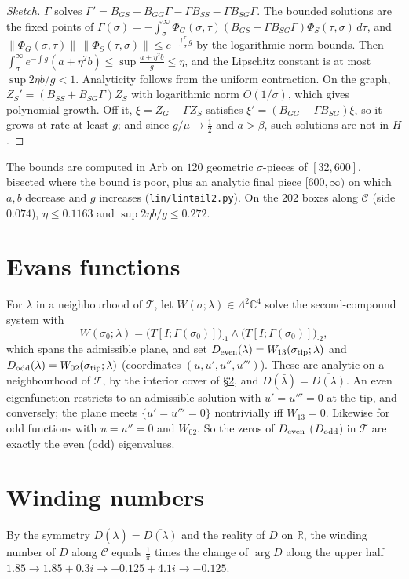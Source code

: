 \documentclass[11pt]{amsart}
\theoremstyle{remark}
\newcommand{\R}{\mathbb{R}}
\newcommand{\C}{\mathbb{C}}
\begin{document}
\begin{proof}[Sketch]
$\Gamma$ solves $\Gamma'=B_{GS}+B_{GG}\Gamma-\Gamma B_{SS}-\Gamma B_{SG}\Gamma$. The bounded solutions are the fixed points of $\Gamma(\sigma)=-\int_\sigma^\infty\Phi_G(\sigma,\tau)(B_{GS}-\Gamma B_{SG}\Gamma)\Phi_S(\tau,\sigma)\,d\tau$, and $\|\Phi_G(\sigma,\tau)\|\,\|\Phi_S(\tau,\sigma)\|\le e^{-\int_\sigma^\tau g}$ by the logarithmic-norm bounds. Then $\int_\sigma^\infty e^{-\int g}(a+\eta^2b)\le\sup\frac{a+\eta^2b}g\le\eta$, and the Lipschitz constant is at most $\sup2\eta b/g<1$. Analyticity follows from the uniform contraction. On the graph, $Z_S'=(B_{SS}+B_{SG}\Gamma)Z_S$ with logarithmic norm $O(1/\sigma)$, which gives polynomial growth. Off it, $\xi=Z_G-\Gamma Z_S$ satisfies $\xi'=(B_{GG}-\Gamma B_{SG})\xi$, so it grows at rate at least $g$; and since $g/\mu\to\frac12$ and $a>\beta$, such solutions are not in $H$.
\end{proof}

The bounds are computed in Arb on $120$ geometric $\sigma$-pieces of $[32,600]$, bisected where the bound is poor, plus an analytic final piece $[600,\infty)$ on which $a,b$ decrease and $g$ increases (\texttt{lin/lintail2.py}). On the $202$ boxes along $\mathcal C$ (side $0.074$), $\eta\le0.1163$ and $\sup 2\eta b/g\le0.272$.

\section{Evans functions}\label{sec:evans}
For $\lambda$ in a neighbourhood of $\mathcal T$, let $W(\sigma;\lambda)\in\Lambda^2\C^4$ solve the second-compound system with
\[
W(\sigma_0;\lambda)=\big(T[I;\Gamma(\sigma_0)]\big)_{\cdot 1}\wedge\big(T[I;\Gamma(\sigma_0)]\big)_{\cdot 2},
\]
which spans the admissible plane, and set $D_{\rm even}(\lambda)=W_{13}(\sigma_{\rm tip};\lambda)$ and $D_{\rm odd}(\lambda)=W_{02}(\sigma_{\rm tip};\lambda)$ (coordinates $(u,u',u'',u''')$). These are analytic on a neighbourhood of $\mathcal T$, by the interior cover of \S\ref{sec:winding}, and $D(\bar\lambda)=\overline{D(\lambda)}$. An even eigenfunction restricts to an admissible solution with $u'=u'''=0$ at the tip, and conversely; the plane meets $\{u'=u'''=0\}$ nontrivially iff $W_{13}=0$. Likewise for odd functions with $u=u''=0$ and $W_{02}$. So the zeros of $D_{\rm even}$ ($D_{\rm odd}$) in $\mathcal T$ are exactly the even (odd) eigenvalues.

\section{Winding numbers}\label{sec:winding}
By the symmetry $D(\bar\lambda)=\overline{D(\lambda)}$ and the reality of $D$ on $\R$, the winding number of $D$ along $\mathcal C$ equals $\frac1\pi$ times the change of $\arg D$ along the upper half $1.85\to1.85+0.3i\to-0.125+4.1i\to-0.125$.
\end{document}
